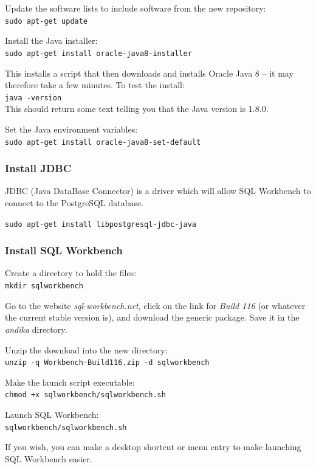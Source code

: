 \documentclass[a4paper,10pt, oneside]{book}
\begin{document}
Update the software lists to include software from the new repository:\\
\verb|sudo apt-get update|

Install the Java installer:\\
\verb|sudo apt-get install oracle-java8-installer|

This installs a script that then downloads and installs Oracle Java 8 -- it may therefore take a few minutes.  To test the install:\\
\verb|java -version|\\
This should return some text telling you that the Java version is 1.8.0.

Set the Java environment variables:\\
\verb|sudo apt-get install oracle-java8-set-default|

\subsubsection{Install JDBC}
\label{ss:jdbc}

JDBC (Java DataBase Connector) is a driver which will allow SQL Workbench to connect to the PostgreSQL database.

\verb|sudo apt-get install libpostgresql-jdbc-java|

\subsubsection{Install SQL Workbench}

Create a directory to hold the files:\\
\verb|mkdir sqlworkbench|

Go to the website \textit{sql-workbench.net}, click on the link for \textit{Build 116} (or whatever the current stable version is), and download the generic package.  Save it in the \textit{andika} directory.

Unzip the download into the new directory:\\
\verb|unzip -q Workbench-Build116.zip -d sqlworkbench|

Make the launch script executable:\\
\verb|chmod +x sqlworkbench/sqlworkbench.sh|

Launch SQL Workbench:\\
\verb|sqlworkbench/sqlworkbench.sh|

If you wish, you can make a desktop shortcut or menu entry to make launching SQL Workbench easier.
\end{document}
